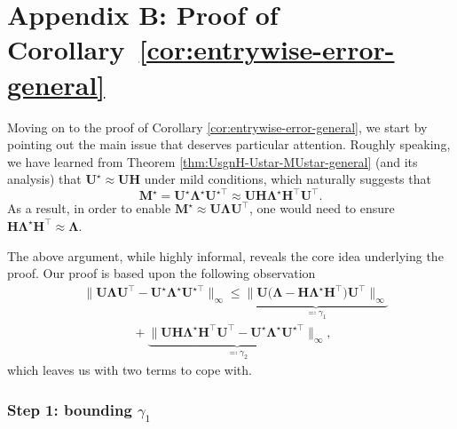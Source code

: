 




\section{Appendix B: Proof of Corollary~\ref{cor:entrywise-error-general}}
\label{sec:proof-cor-entrywise-error}





Moving on to the proof of Corollary \ref{cor:entrywise-error-general},
we start by pointing out the main issue that deserves particular attention.
Roughly speaking, we have learned from Theorem \ref{thm:UsgnH-Ustar-MUstar-general}
(and its analysis) that $\bm{U}^{\star}\approx\bm{U}\bm{H}$ under
mild conditions, which naturally suggests that
\[
\bm{M}^{\star}=\bm{U}^{\star}\bm{\Lambda}^{\star}\bm{U}^{\star\top}\approx\bm{U}\bm{H}\bm{\Lambda}^{\star}\bm{H}^{\top}\bm{U}^{\top}.
\]
As a result, in order to enable $\bm{M}^{\star}\approx\bm{U}\bm{\Lambda}\bm{U}^{\top}$,
one would need to ensure
$\bm{H}\bm{\Lambda}^{\star}\bm{H}^{\top}\approx\bm{\Lambda}$.

The above argument, while highly informal, reveals the core idea underlying
the proof. Our proof is based upon the following observation
%
\begin{align}
	& \big\|\bm{U}\bm{\Lambda}\bm{U}^{\top}-\bm{U}^{\star}\bm{\Lambda}^{\star}\bm{U}^{\star\top}\big\|_{\infty}
  \leq\underset{\eqqcolon\mathcal{\gamma}_{1}}{\underbrace{\big\|\bm{U}\big(\bm{\Lambda}-\bm{H}\bm{\Lambda}^{\star}\bm{H}^{\top}\big)\bm{U}^{\top}\big\|_{\infty}}}\nonumber \\
 & \quad\quad\quad\quad+
	\underset{\eqqcolon\gamma_{2}}{\underbrace{\big\|\bm{U}\bm{H}\bm{\Lambda}^{\star}\bm{H}^{\top}\bm{U}^{\top}-\bm{U}^{\star}\bm{\Lambda}^{\star}\bm{U}^{\star\top}\big\|_{\infty}}},
\label{eq:ULambdaU-YLambdaY-decompose}
\end{align}
%
which leaves us with two terms to cope with.



\subsubsection{Step 1: bounding $\gamma_1$}

